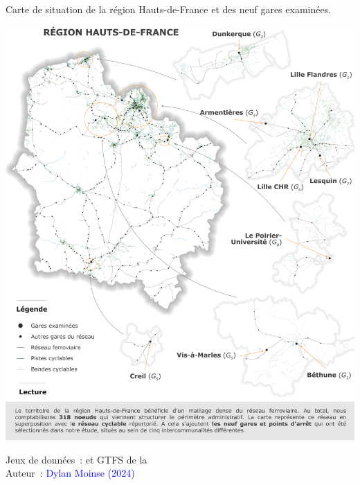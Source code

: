 \begin{refsegment}
    \begin{carte}[h!]%
        \caption{Carte de situation de la région Hauts-de-France et des neuf gares examinées.}
        \label{fig-chap3:gares-examinees}
        \centerline{\includegraphics[width=1\columnwidth]{src/Figures/Chap-3/FR_Carte_situation_gares_examinees.png}}
        \vspace{5pt}
        \begin{flushright}\scriptsize{
        Jeux de données~: \textcolor{blue}{\textcite{openstreetmap_openstreetmap_2023}} et \acrshort{GTFS} de la \textcolor{blue}{\textcite{sncf_reseau_2024}}
        \\
        Auteur~: \textcolor{blue}{Dylan Moinse (2024)}
        }\end{flushright}
    \end{carte}


\end{refsegment}
